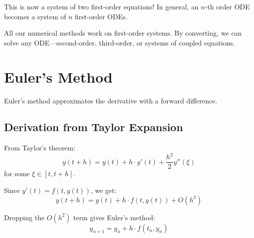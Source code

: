 This is now a system of two first-order equations! In general, an $n$-th order ODE becomes a system of $n$ first-order ODEs.

 All our numerical methods work on first-order systems. By converting, we can solve any ODE---second-order, third-order, or systems of coupled equations.




\newpage
\section{Euler's Method}

 Euler's method approximates the derivative with a forward difference.

\subsection{Derivation from Taylor Expansion}

From Taylor's theorem:
\begin{equation}
    y(t + h) = y(t) + h \cdot y'(t) + \frac{h^2}{2} y''(\xi)
\end{equation}
for some $\xi \in [t, t+h]$.

Since $y'(t) = f(t, y(t))$, we get:
\begin{equation}
    y(t + h) = y(t) + h \cdot f(t, y(t)) + O(h^2)
\end{equation}

Dropping the $O(h^2)$ term gives Euler's method:
\begin{equation}
    \boxed{y_{n+1} = y_n + h \cdot f(t_n, y_n)}
\end{equation}


